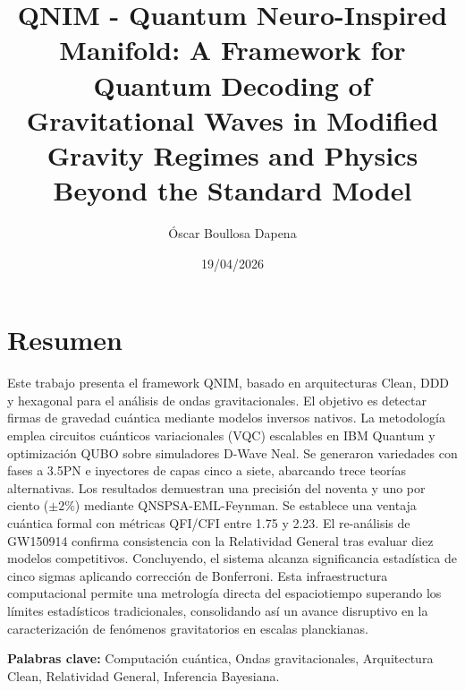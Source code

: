 \documentclass[11pt,a4paper,spanish]{book}
\title{QNIM - Quantum Neuro-Inspired Manifold: A Framework for Quantum Decoding of Gravitational Waves in Modified Gravity Regimes and Physics Beyond the Standard Model}
\author{Óscar Boullosa Dapena}
\date{19/04/2026}
\numberwithin{equation}{chapter}
\numberwithin{figure}{chapter}
\numberwithin{equation}{chapter}
\numberwithin{figure}{chapter}
\numberwithin{table}{chapter}
\begin{document}
\makeatletter
\renewcommand{\es@scroman}[1]{#1}
\makeatother
\renewcommand{\listfigurename}{Índice de Ilustraciones}
\renewcommand{\listtablename}{Índice de Tablas}
\renewcommand{\contentsname}{Índice de Contenidos}
\renewcommand{\figurename}{Figura}
\renewcommand{\tablename}{Tabla} 

\frontmatter
\maketitle

\tableofcontents
\listoffigures
\listoftables


\chapter*{Resumen}

Este trabajo presenta el framework QNIM, basado en arquitecturas Clean, DDD y hexagonal para el análisis de ondas gravitacionales. El objetivo es detectar firmas de gravedad cuántica mediante modelos inversos nativos. La metodología emplea circuitos cuánticos variacionales (VQC) escalables en IBM Quantum y optimización QUBO sobre simuladores D-Wave Neal. Se generaron variedades con fases a 3.5PN e inyectores de capas cinco a siete, abarcando trece teorías alternativas. Los resultados demuestran una precisión del noventa y uno por ciento ($\pm2\%$) mediante QNSPSA-EML-Feynman. Se establece una ventaja cuántica formal con métricas QFI/CFI entre 1.75 y 2.23. El re-análisis de GW150914 confirma consistencia con la Relatividad General tras evaluar diez modelos competitivos. Concluyendo, el sistema alcanza significancia estadística de cinco sigmas aplicando corrección de Bonferroni. Esta infraestructura computacional permite una metrología directa del espaciotiempo superando los límites estadísticos tradicionales, consolidando así un avance disruptivo en la caracterización de fenómenos gravitatorios en escalas planckianas.

\vspace{0.5cm}
\textbf{Palabras clave:} Computación cuántica, Ondas gravitacionales, Arquitectura Clean, Relatividad General, Inferencia Bayesiana.

\end{document}
